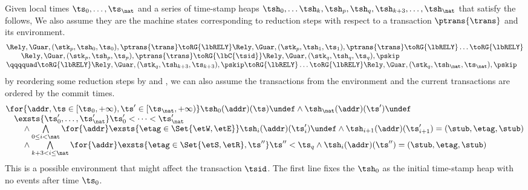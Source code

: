 \begin{defn}
\label{def:trans-run-within-env}
Given local times \( \ts_{0}, \dots,  \ts_{\nat} \) and a series of time-stamp heaps \( \tsh_{0}, \dots \tsh_{k}, \tsh_{p}, \tsh_{q}, \tsh_{k+3}, \dots, \tsh_{\nat} \) that satisfy the follows,
We also assume they are the machine states corresponding to reduction steps with respect to a transaction \( \ptrans{\trans} \) and its environment.
\[
\begin{array}{@{}l@{}}
    \Rely, \Guar, (\stk_{p}, \tsh_{0}, \ts_{0}), \ptrans{\trans} \toRG{\lbRELY} \Rely, \Guar, (\stk_{p}, \tsh_{1}, \ts_{1}), \ptrans{\trans}  \toRG{\lbRELY} \dots  \toRG{\lbRELY} \\
    \qquad \Rely, \Guar, (\stk_{p}, \tsh_{p}, \ts_{p}),  \ptrans{\trans} \toRG{\lbC{\tsid}} \Rely, \Guar, (\stk_{q}, \tsh_{q}, \ts_{q}),  \pskip \\
    \qqqquad \toRG{\lbRELY} \Rely, \Guar, (\stk_{q}, \tsh_{k+3}, \ts_{k+3}), \pskip \toRG{\lbRELY} \dots \toRG{\lbRELY} \Rely, \Guar, (\stk_{q}, \tsh_{\nat}, \ts_{\nat}), \pskip
\end{array}
\]
by reordering some reduction steps by  and , we can also assume the transactions from the environment and the current transactions  are ordered by the commit times.
\[
\begin{array}{@{}l@{}}
    \for{ \addr, \ts \in [\ts_{0}, +\infty), \ts' \in [\ts_{\nat}, +\infty) }
    \tsh_{0}(\addr)(\ts) \undef
    \land \tsh_{\nat}(\addr)(\ts') \undef \\
    \quad \exsts{ \ts_{0}', \dots, \ts_{\nat}' } \ts_{0}' < \dots < \ts_{\nat}' \\
    \qquad {}\land \bigwedge\limits_{0 \leq i < \nat} \for{\addr} \exsts{\etag \in \Set{\etW, \etE}}
    \tsh_{i}(\addr)(\ts_{i}') \undef \land \tsh_{i+1}(\addr)(\ts_{i+1}') = (\stub, \etag, \stub) \\
    \qquad {}\land \bigwedge\limits_{k+3 < i \leq \nat} \for{\addr} \exsts{\etag \in \Set{\etS, \etR}, \ts''}
    \ts'' < \ts_{q}
    \land \tsh_{i}(\addr)(\ts'') = (\stub, \etag, \stub)
    \end{array}
\]
This is a possible environment that might affect the transaction \( \tsid \).
The first line fixes the \( \tsh_{0} \) as the initial time-stamp heap with no events after time \( \ts_{0} \).
\end{defn}
